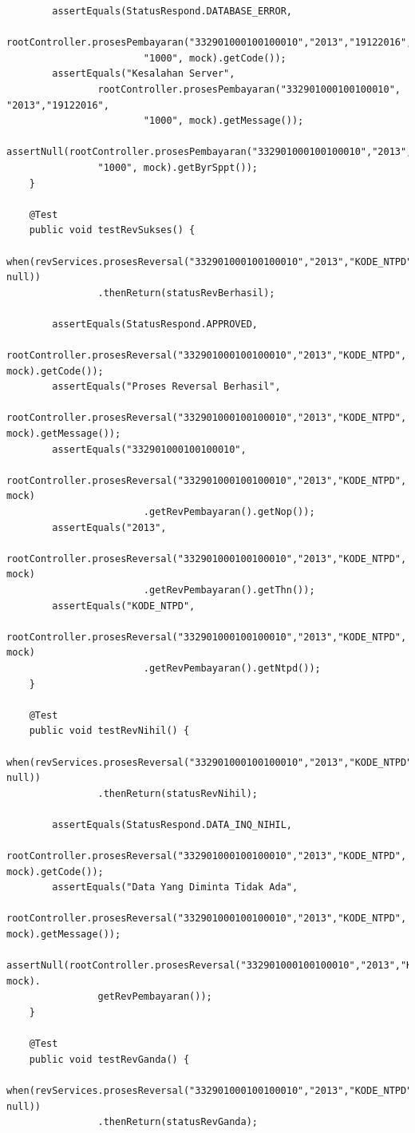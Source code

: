 \documentclass[pdftex,12pt, oneside]{article}
\begin{document}
\begin{enumerate}[A.]
\begin{enumerate}[1.]
\begin{lstlisting}
        assertEquals(StatusRespond.DATABASE_ERROR,
                rootController.prosesPembayaran("332901000100100010","2013","19122016",
                        "1000", mock).getCode());
        assertEquals("Kesalahan Server",
                rootController.prosesPembayaran("332901000100100010", "2013","19122016",
                        "1000", mock).getMessage());
        assertNull(rootController.prosesPembayaran("332901000100100010","2013","19122016",
                "1000", mock).getByrSppt());
    }

    @Test
    public void testRevSukses() {
        when(revServices.prosesReversal("332901000100100010","2013","KODE_NTPD", null))
                .thenReturn(statusRevBerhasil);

        assertEquals(StatusRespond.APPROVED,
                rootController.prosesReversal("332901000100100010","2013","KODE_NTPD", mock).getCode());
        assertEquals("Proses Reversal Berhasil",
                rootController.prosesReversal("332901000100100010","2013","KODE_NTPD", mock).getMessage());
        assertEquals("332901000100100010",
                rootController.prosesReversal("332901000100100010","2013","KODE_NTPD", mock)
                        .getRevPembayaran().getNop());
        assertEquals("2013",
                rootController.prosesReversal("332901000100100010","2013","KODE_NTPD", mock)
                        .getRevPembayaran().getThn());
        assertEquals("KODE_NTPD",
                rootController.prosesReversal("332901000100100010","2013","KODE_NTPD", mock)
                        .getRevPembayaran().getNtpd());
    }

    @Test
    public void testRevNihil() {
        when(revServices.prosesReversal("332901000100100010","2013","KODE_NTPD", null))
                .thenReturn(statusRevNihil);

        assertEquals(StatusRespond.DATA_INQ_NIHIL,
                rootController.prosesReversal("332901000100100010","2013","KODE_NTPD", mock).getCode());
        assertEquals("Data Yang Diminta Tidak Ada",
                rootController.prosesReversal("332901000100100010","2013","KODE_NTPD", mock).getMessage());
        assertNull(rootController.prosesReversal("332901000100100010","2013","KODE_NTPD", mock).
                getRevPembayaran());
    }

    @Test
    public void testRevGanda() {
        when(revServices.prosesReversal("332901000100100010","2013","KODE_NTPD", null))
                .thenReturn(statusRevGanda);


\end{lstlisting}
\end{enumerate}
\end{enumerate}
\end{document}
